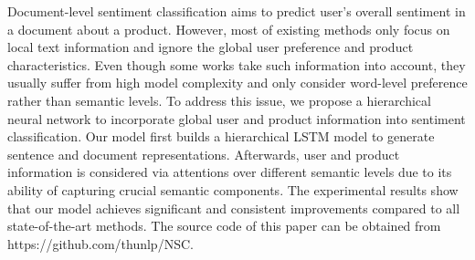 Document-level sentiment classification aims to predict user's overall sentiment in a document about a product. However, most of existing methods only focus on local text information and ignore the global user preference and product characteristics. Even though some works take such information into account, they usually suffer from high model complexity and only consider word-level preference rather than semantic levels. To address this issue, we propose a hierarchical neural network  to incorporate global user and product information into sentiment classification. Our model first builds a hierarchical LSTM model to generate sentence and document representations. Afterwards, user and product information is considered via attentions over different semantic levels due to its ability of capturing crucial semantic components. The experimental results show that our model achieves significant and consistent improvements compared to all state-of-the-art methods. The source code of this paper can be obtained from https://github.com/thunlp/NSC.
